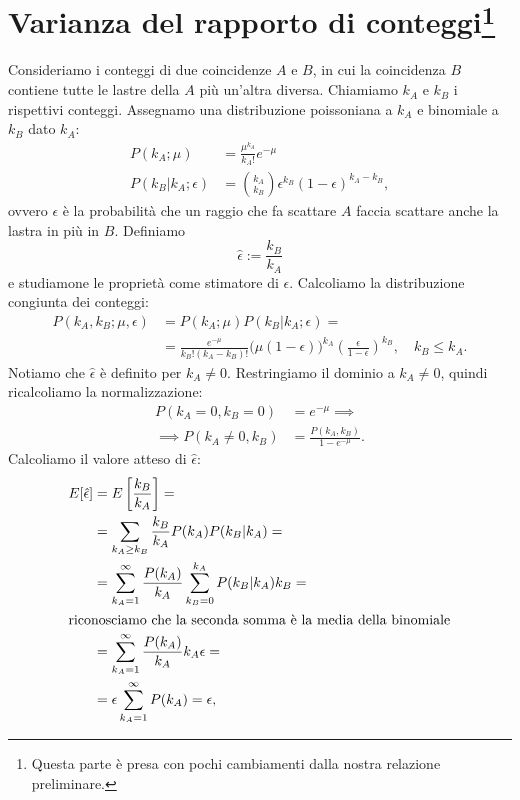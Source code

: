 \appendix
\section{Varianza del rapporto di conteggi\protect\footnote{Questa parte è presa con pochi cambiamenti dalla nostra relazione preliminare.}}
\label{sec:vareff}

Consideriamo i conteggi di due coincidenze $A$ e $B$,
in cui la coincidenza $B$ contiene tutte le lastre della $A$ più un'altra diversa.
Chiamiamo $k_A$ e $k_B$ i rispettivi conteggi.
Assegnamo una distribuzione poissoniana a $k_A$ e binomiale a $k_B$ dato $k_A$:
\begin{align*}
	P(k_A;\mu)
	&= \frac{\mu^{k_A}}{k_A!}e^{-\mu} \\
	P(k_B|k_A;\epsilon)
	&= \binom{k_A}{k_B} \epsilon^{k_B} (1-\epsilon)^{k_A-k_B},
\end{align*}
ovvero $\epsilon$ è la probabilità che un raggio che fa scattare $A$
faccia scattare anche la lastra in più in $B$.
Definiamo
\begin{equation*}
	\hat\epsilon := \frac{k_B}{k_A}
\end{equation*}
e studiamone le proprietà come stimatore di $\epsilon$.
Calcoliamo la distribuzione congiunta dei conteggi:
\begin{align*}
	P(k_A,k_B;\mu,\epsilon)
	&= P(k_A;\mu) P(k_B|k_A;\epsilon) = \\
	&= \frac{e^{-\mu}}{k_B!(k_A-k_B)!} \big(\mu(1-\epsilon)\big)^{k_A} \left(\frac\epsilon{1-\epsilon}\right)^{k_B},
	\quad k_B \le k_A.
\end{align*}
Notiamo che $\hat\epsilon$ è definito per $k_A\neq 0$.
Restringiamo il dominio a $k_A\neq 0$,
quindi ricalcoliamo la normalizzazione:
\begin{align*}
	P(k_A=0,k_B=0)
	&= e^{-\mu} \implies \\
	\implies P(k_A\neq 0,k_B)
	&= \frac{P(k_A,k_B)}{1-e^{-\mu}}.
\end{align*}
Calcoliamo il valore atteso di $\hat\epsilon$:
\begin{align*}
	E[\hat\epsilon]
	&= E \left[ \frac{k_B}{k_A} \right] = \\
	&= \sum_{k_A\ge k_B} \frac{k_B}{k_A} P(k_A) P(k_B|k_A) = \\
	&= \sum_{k_A=1}^\infty \frac{P(k_A)}{k_A}
	\sum_{k_B=0}^{k_A} P(k_B|k_A) k_B = \\
	\intertext{riconosciamo che la seconda somma è la media della binomiale}
	&= \sum_{k_A=1}^\infty \frac{P(k_A)}{k_A} k_A \epsilon = \\
	&= \epsilon \sum_{k_A=1}^\infty P(k_A)
	= \epsilon,
\end{align*}
